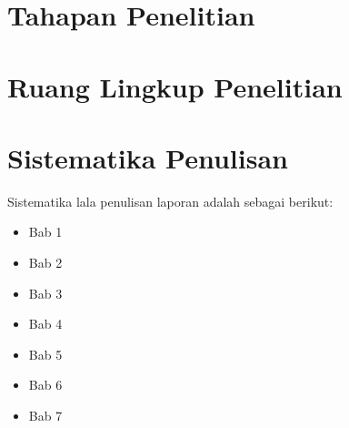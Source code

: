\paragraph{}

\section{Tahapan Penelitian}
\section{Ruang Lingkup Penelitian}

\section{Sistematika Penulisan}
Sistematika lala penulisan laporan adalah sebagai berikut:
\begin{itemize}
	\item Bab 1 \babSatu \\
	\item Bab 2 \babDua \\
	\item Bab 3 \babTiga \\
	\item Bab 4 \babEmpat \\
	\item Bab 5 \babLima \\
	\item Bab 6 \babEnam \\
	\item Bab 7 \babTujuh \\
\end{itemize}

